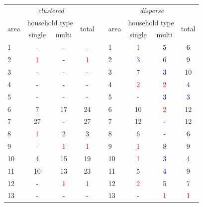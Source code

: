 \begin{table}[H]
    \centering
    \begin{tabular}{|l|cc|c|  c  |l|cc|c|}
        \multicolumn{4}{c}{\emph{clustered}} & \multicolumn{1}{c}{} & \multicolumn{4}{c}{\emph{disperse}}\\[7pt]
        \cline{1-4} \cline{6-9}
        \multirow{2}{*}{area} & \multicolumn{2}{c|}{household type} & \multirow{2}{*}{total} & &
        \multirow{2}{*}{area} & \multicolumn{2}{c|}{household type} & \multirow{2}{*}{total}\\[5pt]
         & single & multi & & & & single & multi & \\
        \cline{1-4} \cline{6-9}
        1  & -  & -  & - &  & 1  & \textcolor{red}{1}  & 5 & 6  \\
        2  & \cellcolor{lgrey}\textcolor{red}{1}  & \cellcolor{lgrey}- & \cellcolor{lgrey}\textcolor{red}{1} &  & 2  & \textcolor{blue}{3}  & 6 & 9  \\
        3  & -  & -  & -  &  & 3  & 7  & \textcolor{blue}{3} & 10 \\
        4  & -  & -  & -  &  & 4  & \textcolor{red}{2}  & \textcolor{red}{2} & \textcolor{blue}{4}  \\
        5  & -  & -  & -  &  & 5  & \cellcolor{lgrey}-  & \cellcolor{lgrey}\textcolor{blue}{3} & \cellcolor{lgrey}\textcolor{blue}{3}  \\
        6  & 7  & 17 & 24 &  & 6  & 10 & \textcolor{red}{2} & 12 \\
        7  & \cellcolor{lgrey}27 & \cellcolor{lgrey}-  & \cellcolor{lgrey}27 &  & 7  & \cellcolor{lgrey}12 & \cellcolor{lgrey}- & \cellcolor{lgrey}12 \\
        8  & \textcolor{red}{1}  & \textcolor{red}{2}  & 3  &  & 8  & \cellcolor{lgrey}6  & \cellcolor{lgrey}- & \cellcolor{lgrey}6  \\
        9  & \cellcolor{lgrey}- & \cellcolor{lgrey}\textcolor{red}{1}  & \cellcolor{lgrey}\textcolor{red}{1}  &  & 9  & \textcolor{red}{1}  & 8 & 9  \\
        10 & \textcolor{blue}{4}  & 15 & 19 &  & 10 & \textcolor{red}{1}  & \textcolor{blue}{3} & \textcolor{blue}{4}  \\
        11 & 10 & 13 & 23 &  & 11 & 5  & \textcolor{blue}{4} & 9  \\
        12 & \cellcolor{lgrey}-  & \cellcolor{lgrey}\textcolor{red}{1}  & \cellcolor{lgrey}\textcolor{red}{1}  &  & 12 & \textcolor{red}{2}  & 5 & 7  \\
        13 & -  & -  & -  &  & 13 & \cellcolor{lgrey}-  & \cellcolor{lgrey}\textcolor{red}{1} & \cellcolor{lgrey}\textcolor{red}{1}  \\

\end{tabular}
\end{table}
